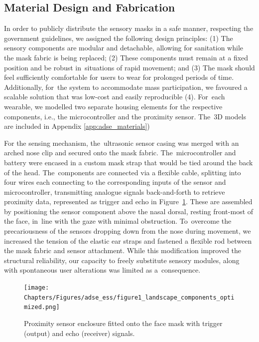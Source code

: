 \subsection*{Material Design and Fabrication}
\label{subsec:fabrication}

In order to publicly distribute the sensory masks in a safe manner, respecting the government guidelines, we assigned the following design principles: (1) The sensory components are modular and detachable, allowing for sanitation while the mask fabric is being replaced; (2) These components must remain at a fixed position and be robust in~situations of rapid movement; and (3) The mask should feel sufficiently comfortable for users to wear for prolonged periods of time. Additionally, for~the system to accommodate mass participation, we favoured a scalable solution that was low-cost and easily reproducible (4). For~each wearable, we modelled two separate housing elements for the respective components, i.e., the microcontroller and the proximity sensor. The~3D models are included in Appendix \ref{app:adse_materials})

For the sensing mechanism, the~ultrasonic sensor casing was merged with an arched nose clip and secured onto the mask fabric. The~microcontroller and battery were encased in a custom mask strap that would be tied around the back of the head. The~components are connected via a flexible cable, splitting into four wires each connecting to the corresponding inputs of the sensor and microcontroller, transmitting analogue signals back-and-forth to retrieve proximity data, represented as trigger and echo in Figure~\ref{fig:sensor_model}. These are assembled by positioning the sensor component above the nasal dorsal, resting front-most of the face, in~line with the gaze with minimal obstruction. To~overcome the precariousness of the sensors dropping down from the nose during movement, we increased the tension of the elastic ear straps and fastened a flexible rod between the mask fabric and sensor attachment. While this modification improved the structural reliability, our capacity to freely substitute sensory modules, along with spontaneous user alterations was limited as a~consequence.

\begin{figure}
\captionsetup{width=1.0\textwidth}
\texttt{[image: Chapters/Figures/adse\_ess/figure1\_landscape\_components\_optimized.png]}
{\caption{Proximity sensor enclosure fitted onto the face mask with trigger (output) and echo (receiver) signals.
}\label{fig:sensor_model}}
\end{figure}
\unskip

